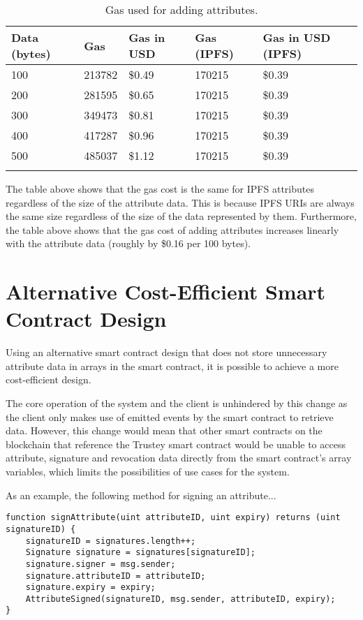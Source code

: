 \documentclass[12pt]{report}
\begin{document}
	\begin{longtable}{|p{2.3cm}|p{2.3cm}|p{2.3cm}|p{2.3cm}|p{2.4cm}|}
		\hline
		\textbf{Data (bytes)} & \textbf{Gas} & \textbf{Gas in USD} & \textbf{Gas (IPFS)} & \textbf{Gas in USD (IPFS)} \\ \hline
		100 & 213782 & \$0.49 & 170215 & \$0.39 \\ \hline
		200 & 281595 & \$0.65 & 170215 & \$0.39 \\ \hline
		300 & 349473 & \$0.81 & 170215 & \$0.39 \\ \hline
		400 & 417287 & \$0.96 & 170215 & \$0.39 \\ \hline
		500 & 485037 & \$1.12 & 170215 & \$0.39 \\ \hline
		\caption{Gas used for adding attributes.}
	\end{longtable}
	
	The table above shows that the gas cost is the same for IPFS attributes regardless of the size of the attribute data. This is because IPFS URIs are always the same size regardless of the size of the data represented by them. Furthermore, the table above shows that the gas cost of adding attributes increases linearly with the attribute data (roughly by \$0.16 per 100 bytes).
	
	\section{Alternative Cost-Efficient Smart Contract Design}
	Using an alternative smart contract design that does not store unnecessary attribute data in arrays in the smart contract, it is possible to achieve a more cost-efficient design.
	
	The core operation of the system and the client is unhindered by this change as the client only makes use of emitted events by the smart contract to retrieve data. However, this change would mean that other smart contracts on the blockchain that reference the Trustey smart contract would be unable to access attribute, signature and revocation data directly from the smart contract's array variables, which limits the possibilities of use cases for the system.
	
	As an example, the following method for signing an attribute...
	\begin{lstlisting}
function signAttribute(uint attributeID, uint expiry) returns (uint signatureID) {
    signatureID = signatures.length++;
    Signature signature = signatures[signatureID];
    signature.signer = msg.sender;
    signature.attributeID = attributeID;
    signature.expiry = expiry;
    AttributeSigned(signatureID, msg.sender, attributeID, expiry);
}
	\end{lstlisting}
	
\end{document}
